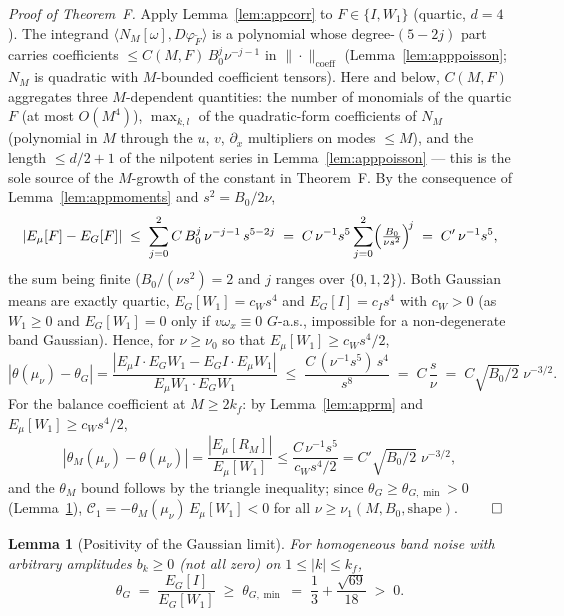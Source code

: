 \documentclass[11pt]{article}
\newtheorem{lemma}[theorem]{Lemma}
\theoremstyle{remark}
\theoremstyle{plain}
\begin{document}
\emph{Proof of Theorem~F.} Apply Lemma~\ref{lem:appcorr} to $F \in \{I, W_1\}$ (quartic, $d=4$). The
integrand $\langle N_M[\omega], D\varphi_{\tilde F}\rangle$ is a polynomial whose degree-$(5-2j)$ part
carries coefficients $\le C(M,F)\,B_0^j\nu^{-j-1}$ in $\|\cdot\|_{\mathrm{coeff}}$
(Lemma~\ref{lem:apppoisson}; $N_M$ is quadratic
with $M$-bounded coefficient tensors). Here and below, $C(M,F)$ aggregates three
$M$-dependent quantities: the number of monomials of the quartic $F$ (at most
$O(M^4)$), $\max_{k,l}$ of the quadratic-form coefficients of $N_M$ (polynomial in $M$
through the $u$, $v$, $\partial_x$ multipliers on modes $\le M$), and the length
$\le d/2 + 1$ of the nilpotent series in Lemma~\ref{lem:apppoisson} --- this is the sole
source of the $M$-growth of the constant in Theorem~F. By the consequence of Lemma~\ref{lem:appmoments} and
$s^2 = B_0/2\nu$,
\begin{equation}
  |E_\mu[F] - E_G[F]| \;\le\; \sum_{j=0}^{2} C\,B_0^j\,\nu^{-j-1}\,s^{5-2j}
  \;=\; C\,\nu^{-1}s^5\sum_{j=0}^{2}\Bigl(\tfrac{B_0}{\nu s^2}\Bigr)^{\!j} \;=\; C'\,\nu^{-1}s^5,
\end{equation}
the sum being finite ($B_0/(\nu s^2) = 2$ and $j$ ranges over $\{0,1,2\}$). Both Gaussian means are
exactly quartic, $E_G[W_1] = c_W s^4$ and $E_G[I] = c_I s^4$ with $c_W > 0$ (as $W_1 \ge 0$ and
$E_G[W_1] = 0$ only if $v\omega_x \equiv 0$ $G$-a.s., impossible for a non-degenerate band Gaussian).
Hence, for $\nu \ge \nu_0$ so that $E_\mu[W_1] \ge c_W s^4/2$,
\begin{equation}
  |\theta(\mu_\nu) - \theta_G| = \frac{|E_\mu I\cdot E_G W_1 - E_G I\cdot E_\mu W_1|}{E_\mu W_1\cdot E_G W_1}
  \;\le\; \frac{C\,(\nu^{-1}s^5)\,s^4}{s^8} \;=\; C\,\frac{s}{\nu} \;=\; C\sqrt{B_0/2}\;\nu^{-3/2}.
\end{equation}
For the balance coefficient at $M \ge 2k_f$: by Lemma~\ref{lem:apprm} and
$E_\mu[W_1] \ge c_W s^4/2$,
\begin{equation}
  |\theta_M(\mu_\nu) - \theta(\mu_\nu)| = \frac{|E_\mu[R_M]|}{E_\mu[W_1]}
  \le \frac{C\,\nu^{-1}s^5}{c_W s^4/2} = C'\sqrt{B_0/2}\;\nu^{-3/2},
\end{equation}
and the $\theta_M$ bound follows by the triangle inequality; since
$\theta_G \ge \theta_{G,\min} > 0$ (Lemma~\ref{lem:appthetaG}),
$\mathcal{C}_1 = -\theta_M(\mu_\nu)\,E_\mu[W_1] < 0$ for all $\nu \ge \nu_1(M, B_0, \text{shape})$.
$\qed$

\begin{lemma}[Positivity of the Gaussian limit]\label{lem:appthetaG}
For homogeneous band noise with arbitrary amplitudes $b_k \ge 0$ (not all zero) on
$1 \le |k| \le k_f$,
\begin{equation*}
  \theta_G \;=\; \frac{E_G[I]}{E_G[W_1]} \;\ge\; \theta_{G,\min}
  \;=\; \frac13 + \frac{\sqrt{69}}{18} \;>\; 0 .
\end{equation*}
\end{lemma}
\end{document}

